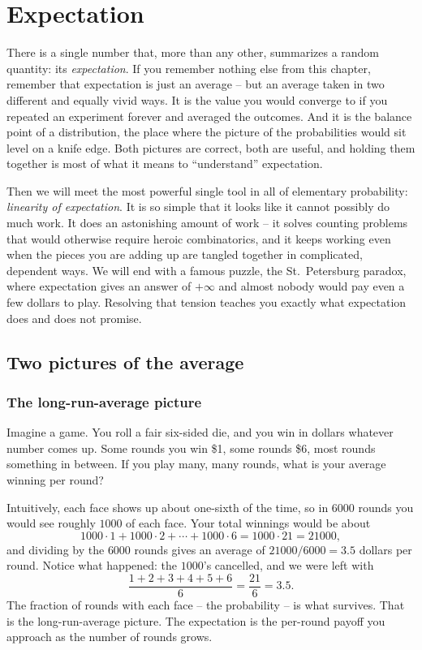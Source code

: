 \chapter{Expectation}

There is a single number that, more than any other, summarizes a random
quantity: its \emph{expectation}. If you remember nothing else from this
chapter, remember that expectation is just an average -- but an average taken
in two different and equally vivid ways. It is the value you would converge to
if you repeated an experiment forever and averaged the outcomes. And it is the
balance point of a distribution, the place where the picture of the probabilities
would sit level on a knife edge. Both pictures are correct, both are useful, and
holding them together is most of what it means to ``understand'' expectation.

Then we will meet the most powerful single tool in all of elementary
probability: \emph{linearity of expectation}. It is so simple that it looks like
it cannot possibly do much work. It does an astonishing amount of work -- it
solves counting problems that would otherwise require heroic combinatorics, and
it keeps working even when the pieces you are adding up are tangled together in
complicated, dependent ways. We will end with a famous puzzle, the St.\
Petersburg paradox, where expectation gives an answer of $+\infty$ and almost
nobody would pay even a few dollars to play. Resolving that tension teaches you
exactly what expectation does and does not promise.

\chapterline

\section{Two pictures of the average}
\label{ch08:two-pictures}

\subsection{The long-run-average picture}

Imagine a game. You roll a fair six-sided die, and you win in dollars whatever
number comes up. Some rounds you win \$1, some rounds \$6, most rounds something
in between. If you play many, many rounds, what is your average winning per
round?

Intuitively, each face shows up about one-sixth of the time, so in $6000$ rounds
you would see roughly $1000$ of each face. Your total winnings would be about
\[
  1000\cdot 1 + 1000\cdot 2 + \cdots + 1000 \cdot 6 = 1000\cdot 21 = 21000,
\]
and dividing by the $6000$ rounds gives an average of $21000/6000 = 3.5$ dollars
per round. Notice what happened: the $1000$'s cancelled, and we were left with
\[
  \frac{1+2+3+4+5+6}{6} = \frac{21}{6} = 3.5.
\]
The fraction of rounds with each face -- the probability -- is what survives.
That is the long-run-average picture. The expectation is the per-round payoff you
approach as the number of rounds grows.

